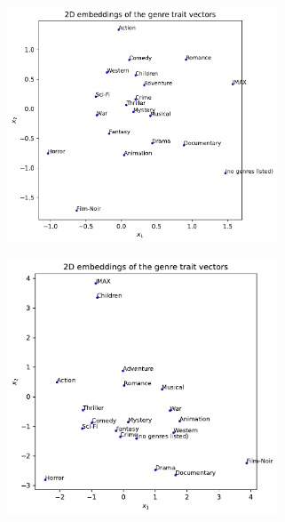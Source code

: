 \documentclass{article}
\begin{document}
\begin{figure}[h!]
    \centering
    \begin{minipage}{.5\textwidth}
      \centering
      \captionsetup{justification=centering}
      \includegraphics[width=0.72\textwidth, height=0.6\textwidth]{graphics/small_2D_genre_vectors.pdf}
      \label{r7}
    \end{minipage}%
    \begin{minipage}{.5\textwidth}
      \centering
      \captionsetup{justification=centering}
      \includegraphics[width=0.72\textwidth, height=0.6\textwidth]{graphics/full_2D_genre_vectors.pdf}
      \label{r8}
    \end{minipage}
\end{figure}

\newpage
\end{document}

